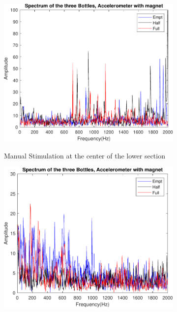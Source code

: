 \begin{figure}[]
    \centering
    \begin{subfigure}{0.45\textwidth}
        \centering
        \includegraphics[width=\linewidth]{Chapters/6CHP/Figures/ResultsSensors/AcImMaBot.pdf}
        \caption{Manual Stimulation at the center of the lower section}{}
        \label{subfig:ResAcImMaBot}
    \end{subfigure}
    \begin{subfigure}{0.45\textwidth}
        \centering
        \includegraphics[width=\linewidth]{Chapters/6CHP/Figures/ResultsSensors/AcImAuBot.pdf}

\end{subfigure}
\end{figure}
